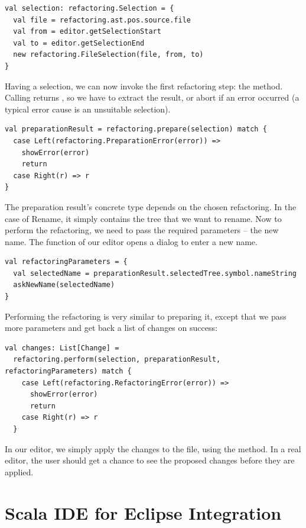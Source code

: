 \documentclass[10pt,a4paper,oneside]{scrreprt}
\begin{document}
\begin{lstlisting}
val selection: refactoring.Selection = {
  val file = refactoring.ast.pos.source.file
  val from = editor.getSelectionStart
  val to = editor.getSelectionEnd
  new refactoring.FileSelection(file, from, to)
}
\end{lstlisting}

Having a selection, we can now invoke the first refactoring step: the  method. Calling  returns , so we have to extract the result, or abort if an error occurred (a typical error cause is an unsuitable selection).

\begin{lstlisting}
val preparationResult = refactoring.prepare(selection) match {
  case Left(refactoring.PreparationError(error)) => 
    showError(error)
    return
  case Right(r) => r
}
\end{lstlisting}

The preparation result's concrete type depends on the chosen refactoring. In the case of Rename, it simply contains the tree that we want to rename. Now to perform the refactoring, we need to pass the required parameters -- the new name. The  function of our editor opens a dialog to enter a new name.

\begin{lstlisting}
val refactoringParameters = {
  val selectedName = preparationResult.selectedTree.symbol.nameString
  askNewName(selectedName)
}
\end{lstlisting}

Performing the refactoring is very similar to preparing it, except that we pass more parameters and get back a list of changes on success:

\begin{lstlisting}
val changes: List[Change] = 
  refactoring.perform(selection, preparationResult, refactoringParameters) match {
    case Left(refactoring.RefactoringError(error)) => 
      showError(error)
      return
    case Right(r) => r
  }
\end{lstlisting}

In our editor, we simply apply the changes to the file, using the  method. In a real editor, the user should get a chance to see the proposed changes before they are applied.

\section{Scala IDE for Eclipse Integration}
\end{document}
